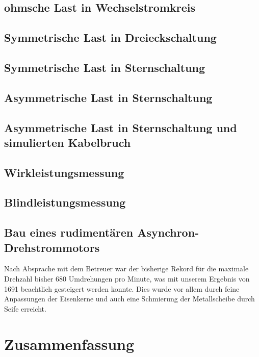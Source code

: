 \documentclass[12pt,english,ngerman]{scrartcl}
\begin{document}
\subsection{ohmsche Last in Wechselstromkreis}

\subsection{Symmetrische Last in Dreieckschaltung}

\subsection{Symmetrische Last in Sternschaltung}

\subsection{Asymmetrische Last in Sternschaltung}

\subsection{Asymmetrische Last in Sternschaltung und simulierten Kabelbruch}

\subsection{Wirkleistungsmessung}

\subsection{Blindleistungsmessung}

\subsection{Bau eines rudimentären Asynchron-Drehstrommotors}

Nach Absprache mit dem Betreuer war der bisherige Rekord für die maximale
Drehzahl bisher 680 Umdrehungen pro Minute, was mit unserem Ergebnis von 1691
beachtlich gesteigert werden konnte. Dies wurde vor allem durch feine
Anpassungen der Eisenkerne und auch eine Schmierung der Metallscheibe durch
Seife erreicht.

\section{Zusammenfassung}\label{sec:zusammenfassung}
\end{document}
